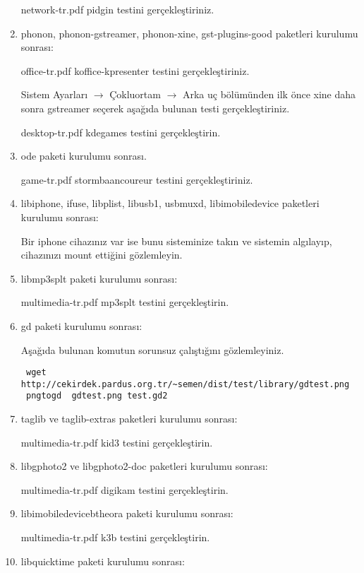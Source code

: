 \documentclass[a4paper,10pt]{article}
\begin{document}
\begin{enumerate}
network-tr.pdf pidgin testini gerçekleştiriniz.

\item phonon, phonon-gstreamer, phonon-xine, gst-plugins-good paketleri kurulumu sonrası:

office-tr.pdf koffice-kpresenter testini gerçekleştiriniz.

Sistem Ayarları $\rightarrow$ Çokluortam $\rightarrow$ Arka uç bölümünden ilk önce xine daha sonra gstreamer seçerek aşağıda bulunan testi gerçekleştiriniz.

desktop-tr.pdf kdegames testini gerçekleştirin.
\item ode paketi kurulumu sonrası.

game-tr.pdf stormbaancoureur testini gerçekleştiriniz.

\item libiphone, ifuse, libplist, libusb1, usbmuxd, libimobiledevice paketleri kurulumu sonrası:

Bir iphone cihazınız var ise bunu sisteminize takın ve sistemin algılayıp, cihazınızı mount ettiğini gözlemleyin.

\item libmp3splt paketi kurulumu sonrası:

multimedia-tr.pdf mp3splt testini gerçekleştirin.

\item gd paketi kurulumu sonrası:

Aşağıda bulunan komutun sorunsuz çalıştığını gözlemleyiniz.

\begin{verbatim}
 wget http://cekirdek.pardus.org.tr/~semen/dist/test/library/gdtest.png
 pngtogd  gdtest.png test.gd2
\end{verbatim}

\item taglib ve taglib-extras paketleri kurulumu sonrası:

multimedia-tr.pdf kid3 testini gerçekleştirin.

\item libgphoto2 ve libgphoto2-doc paketleri kurulumu sonrası:

multimedia-tr.pdf digikam testini gerçekleştirin.

\item libimobiledevicebtheora paketi kurulumu sonrası:

multimedia-tr.pdf k3b testini gerçekleştirin.

\item libquicktime paketi kurulumu sonrası:


\end{enumerate}
\end{document}
